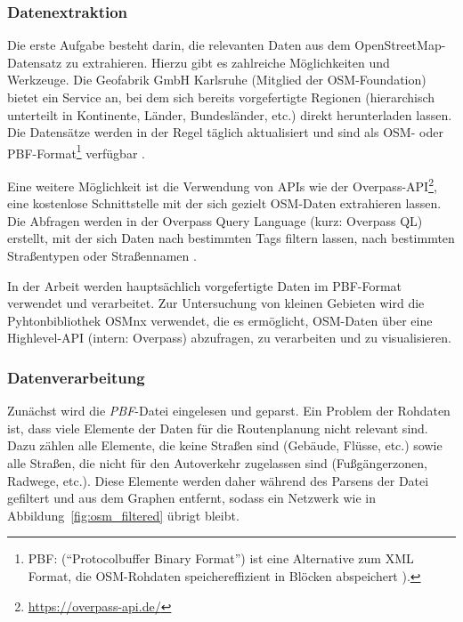 \subsubsection{Datenextraktion}
Die erste Aufgabe besteht darin, die relevanten Daten aus dem OpenStreetMap-Datensatz zu
extrahieren. Hierzu gibt es zahlreiche Möglichkeiten und Werkzeuge. Die Geofabrik GmbH Karlsruhe
(Mitglied der \ac{OSM}-Foundation) bietet \ua ein Service an, bei dem sich bereits vorgefertigte
Regionen (hierarchisch unterteilt in Kontinente, Länder, Bundesländer, etc.) direkt herunterladen
lassen. Die Datensätze werden in der Regel täglich aktualisiert und sind als OSM- oder
PBF-Format\footnote{PBF: ("`Protocolbuffer Binary Format"') ist eine Alternative zum XML Format, die
    OSM-Rohdaten speichereffizient in Blöcken abspeichert \cite{osm.pbf}).} verfügbar
\cite{osm.geofabrik}.

Eine weitere Möglichkeit ist die Verwendung von \acp{API} wie \zB der
Overpass-\ac{API}\footnote{\url{https://overpass-api.de/}}, eine kostenlose Schnittstelle mit der
sich gezielt \ac{OSM}-Daten extrahieren lassen. Die Abfragen werden in der Overpass Query Language
(kurz: Overpass QL) erstellt, mit der sich Daten \ua nach bestimmten Tags filtern lassen, \zB nach
bestimmten Straßentypen oder Straßennamen \cite{osm.overpass}.

In der Arbeit werden hauptsächlich vorgefertigte Daten im PBF-Format verwendet und verarbeitet. Zur Untersuchung von kleinen Gebieten wird die
Pyhtonbibliothek OSMnx \cite{osmnx} verwendet, die es ermöglicht, \ac{OSM}-Daten über eine
Highlevel-\ac{API} (intern: Overpass) abzufragen, zu verarbeiten und zu visualisieren.

\subsubsection{Datenverarbeitung}
Zunächst wird die \emph{PBF}-Datei eingelesen und geparst. Ein Problem der Rohdaten ist, dass viele
Elemente der Daten für die Routenplanung nicht relevant sind. Dazu zählen alle Elemente, die keine
Straßen sind (\zB Gebäude, Flüsse, etc.) sowie alle Straßen, die nicht für den Autoverkehr
zugelassen sind (\zB Fußgängerzonen, Radwege, etc.). Diese Elemente werden daher während des Parsens
der Datei gefiltert und aus dem Graphen entfernt, sodass ein Netzwerk wie in
Abbildung~\ref{fig:osm_filtered} übrigt bleibt.\\

